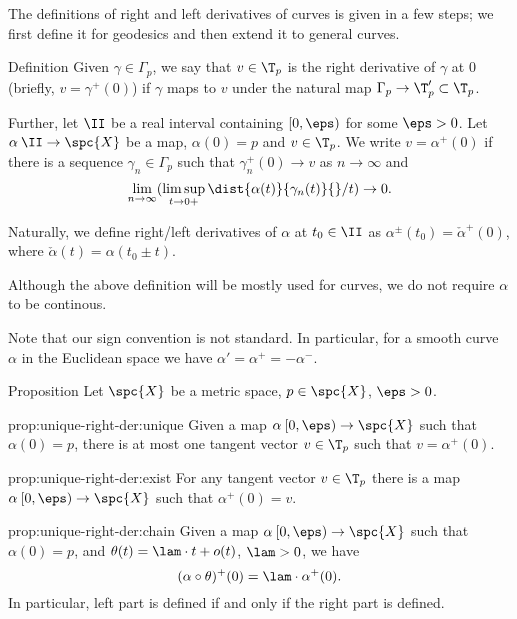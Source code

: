 

The definitions of right and left derivatives of curves is given in a few steps;
we first define it for geodesics and then extend it to general curves.

\begin{thm}{Definition}\label{def:curv^+}
Given $\gamma\in\Gamma_p$, we say that $v\in \T_p$ is the right derivative of $\gamma$ at $0$ (briefly, $v=\gamma^+(0)$)
if $\gamma$ maps to $v$ under 
the natural map $\Gamma_p\to \T_p'\subset\T_p$.

Further, let $\II$ be a real interval containing $[0,\eps)$ for some $\eps>0$.
Let  $\alpha\:\II\to\spc{X}$ be a map, 
$\alpha(0)=p$ and $v\in\T_p$.
We write
$v=\alpha^+(0)$
if there is a sequence $\gamma_n\in\Gamma_p$
such that $\gamma^+_n(0)\to v$ as $n\to\infty$ and 
\[\lim_{n\to\infty}(\limsup_{t\to0+}{\dist{\alpha(t)}{\gamma_n(t)}{}}/{t})\to 0.\]

Naturally, we define right/left derivatives of $\alpha$ at $t_0\in\II$ as $\alpha^\pm(t_0)=\check\alpha^+(0)$, where $\check\alpha(t)=\alpha(t_0\pm t)$.
\end{thm}

Although the above definition will be mostly used for curves, 
we do not require $\alpha$ to be continous.

Note that our sign convention is not standard. 
In particular, for  a smooth curve $\alpha$ in the Euclidean space we have $\alpha'=\alpha^+ =- \alpha^-$.

\begin{thm}{Proposition}\label{prop:unique-right-der}
Let $\spc{X}$ be a metric space,
$p\in \spc{X}$,
$\eps>0$.

\begin{subthm}{prop:unique-right-der:unique}
Given a map $\alpha\:[0,\eps)\to\spc{X}$ such that $\alpha(0)=p$,
there is at most one tangent vector $v\in\T_p$ 
such that $v=\alpha^+(0)$.
\end{subthm}

\begin{subthm}{prop:unique-right-der:exist}
 For any tangent vector $v\in \T_p$ there is a map $\alpha\:[0,\eps)\to\spc{X}$ such that $\alpha^+(0)=v$.
\end{subthm}

\begin{subthm}{prop:unique-right-der:chain}
Given a map $\alpha\:[0,\eps)\to\spc{X}$ such that $\alpha(0)=p$,
and $\theta(t)=\lam\cdot t+o(t)$, $\lam>0$,
we have 
\[(\alpha\circ\theta)^+(0)=\lam\cdot\alpha^+(0).\]
In particular, left part is defined if and only if the right part is defined.
\end{subthm}
\end{thm}

